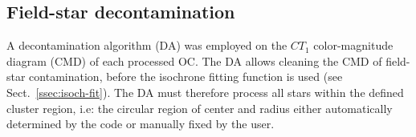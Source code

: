 \documentclass{aa}
\begin{document}

\subsection{Field-star decontamination}
\label{ssec:dencontamination}

A decontamination algorithm (DA) was employed on the $CT_1$
color-magnitude diagram (CMD) of each processed OC.\@
The DA allows cleaning the CMD of field-star contamination, before the isochrone
fitting function is used (see Sect.~\ref{ssec:isoch-fit}). The DA must therefore
process all stars within the defined cluster region, i.e: the circular region of
center and radius either automatically determined by the code or manually fixed
by the user.
\end{document}
